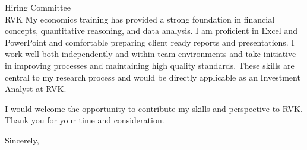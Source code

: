 \documentclass[11pt]{letter}
\begin{document}
\begin{letter}{Hiring Committee \\ RVK}
My economics training has provided a strong foundation in financial concepts, quantitative reasoning, and data analysis. I am proficient in Excel and PowerPoint and comfortable preparing client ready reports and presentations. I work well both independently and within team environments and take initiative in improving processes and maintaining high quality standards. These skills are central to my research process and would be directly applicable as an Investment Analyst at RVK.

I would welcome the opportunity to contribute my skills and perspective to RVK. Thank you for your time and consideration.

\closing{Sincerely,}

\end{letter}
\end{document}
